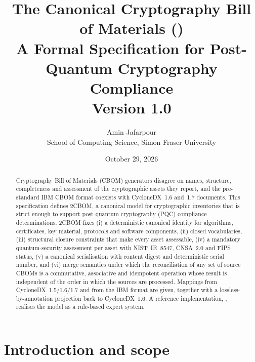 \documentclass[11pt,a4paper]{article}
\title{\textbf{The Canonical Cryptography Bill of Materials (\twocbom)}\\[4pt]
       \large A Formal Specification for Post-Quantum Cryptography Compliance\\[2pt]
       \normalsize Version 1.0}
\author{Amin Jafarpour\\ School of Computing Science, Simon Fraser University}
\date{October 29, 2026}
\newcommand{\twocbom}{2CBOM}
\theoremstyle{definition}
\theoremstyle{plain}
\begin{document}
\maketitle

\begin{abstract}
Cryptography Bill of Materials (CBOM) generators disagree on names, structure, completeness
and assessment of the cryptographic assets they report, and the pre-standard IBM CBOM format
coexists with CycloneDX~1.6 and~1.7 documents. This specification defines \twocbom, a canonical
model for cryptographic inventories that is strict enough to support post-quantum cryptography
(PQC) compliance determinations. \twocbom{} fixes (i) a deterministic canonical identity for
algorithms, certificates, key material, protocols and software components, (ii) closed
vocabularies, (iii) structural closure constraints that make every asset assessable,
(iv) a mandatory quantum-security assessment per asset with NIST~IR~8547, CNSA~2.0 and
FIPS status, (v) a canonical serialisation with content digest and deterministic serial
number, and (vi) merge semantics under which the reconciliation of any set of source CBOMs
is a commutative, associative and idempotent operation whose result is independent of the
order in which the sources are processed. Mappings from CycloneDX~1.5/1.6/1.7 and from the
IBM  format are given, together with a lossless-by-annotation projection
back to CycloneDX~1.6. A reference implementation, , realises the model as a
rule-based expert system.
\end{abstract}

\tableofcontents

\section{Introduction and scope}
\end{document}
